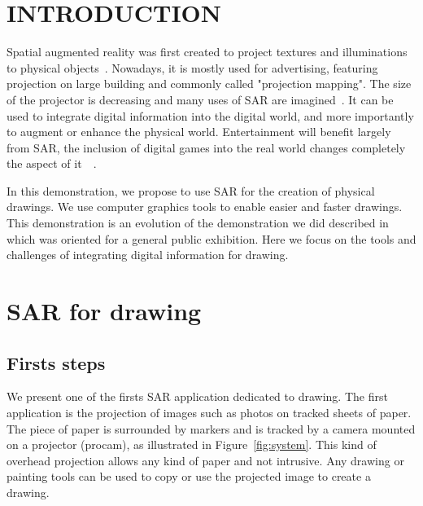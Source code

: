 \documentclass{article}
\begin{document}





\section{INTRODUCTION}

Spatial augmented reality was first created to project textures and illuminations to physical objects~\cite{raskar1999table}. Nowadays, it is mostly used for advertising, featuring projection on large building and commonly called "projection mapping". 
The size of the projector is decreasing and many uses of SAR are imagined~\cite{mistry2009sixthsense}\cite{harrison2011omnitouch}. 
It can be used to integrate digital information into the digital world, and more importantly to augment or enhance the physical world.
Entertainment will benefit largely from SAR, the inclusion of digital games into the real world changes completely the aspect of it~\cite{wilson2007depth}~\cite{jones2010build}.

In this demonstration, we propose to use SAR for the creation of physical drawings. We use computer graphics tools to enable easier and faster drawings. This demonstration is an evolution of the demonstration we did described in~\cite{laviole:2012} which was oriented for a general public exhibition. Here we focus on the tools and challenges of integrating digital information for drawing.  


\section{SAR for drawing}
\subsection{Firsts steps}

We present one of the firsts SAR application dedicated to drawing. The first application is the projection of images such as photos on tracked sheets of paper. The piece of paper is surrounded by markers and is tracked by a camera mounted on a projector (procam), as illustrated in Figure~\ref{fig:system}.
This kind of overhead projection allows any kind of paper and not intrusive. Any drawing or painting tools can be used to  copy or use the projected image to create a drawing. 
\end{document}
